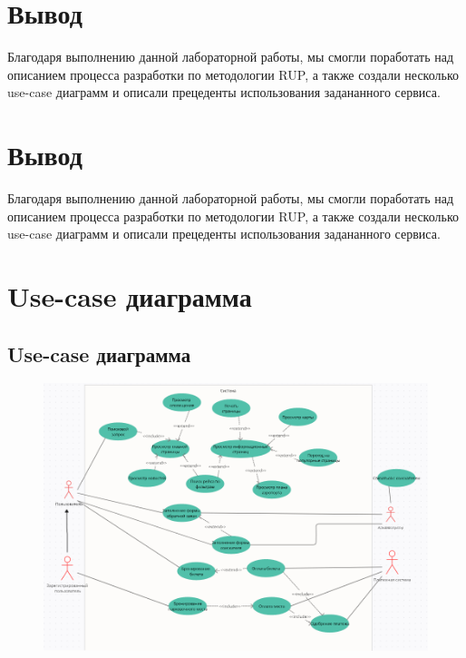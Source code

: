 \documentclass{article}
\begin{document}
\section{Вывод}
Благодаря выполнению данной лабораторной работы, 
мы смогли поработать над описанием процесса разработки 
по методологии RUP, а также создали несколько use-case 
диаграмм и описали прецеденты использования задананного
сервиса. 

\section{Вывод}
Благодаря выполнению данной лабораторной работы, 
мы смогли поработать над описанием процесса разработки 
по методологии RUP, а также создали несколько use-case 
диаграмм и описали прецеденты использования задананного
сервиса. 

\newpage
\section{Use-case диаграмма}

\subsection{Use-case диаграмма}
\begin{figure}[h]
  \includegraphics[width=\textwidth]{use-case-diagram/Use-case.png}
  \centering
\end{figure}
\end{document}
